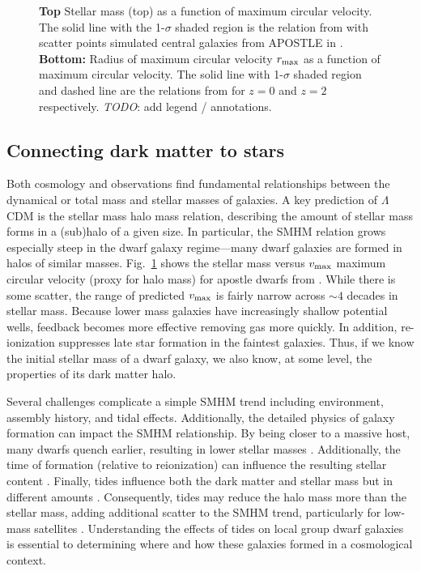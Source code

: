 \begin{figure}
\centering
{}
\caption[Stellar-mass halo-mass relation]{\textbf{Top} Stellar mass
(top) as a function of maximum circular velocity. The solid line with
the 1-\(\sigma\) shaded region is the relation from \citet{fattahi+2018}
with scatter points simulated central galaxies from APOSTLE in
\citet{fattahi+2018}. \textbf{Bottom:} Radius of maximum circular
velocity \(r_{\rm max}\) as a function of maximum circular velocity. The
solid line with 1-\(\sigma\) shaded region and dashed line are the
relations from \citet{ludlow+2016} for \(z=0\) and \(z=2\) respectively.
\emph{TODO}: add legend / annotations.}\label{fig:smhm}
\end{figure}

\subsection{Connecting dark matter to
stars}\label{connecting-dark-matter-to-stars}

Both cosmology and observations find fundamental relationships between
the dynamical or total mass and stellar masses of galaxies. A key
prediction of \(\Lambda\)CDM is the stellar mass halo mass relation,
describing the amount of stellar mass forms in a (sub)halo of a given
size. In particular, the SMHM relation grows especially steep in the
dwarf galaxy regime---many dwarf galaxies are formed in halos of similar
masses. Fig.~\ref{fig:smhm} shows the stellar mass versus
\(v_{\rm max}\) maximum circular velocity (proxy for halo mass) for
apostle dwarfs from \citet{fattahi+2018}. While there is some scatter,
the range of predicted \(v_{\rm max}\) is fairly narrow across
\(\sim 4\) decades in stellar mass. Because lower mass galaxies have
increasingly shallow potential wells, feedback becomes more effective
removing gas more quickly. In addition, re-ionization suppresses late
star formation in the faintest galaxies. Thus, if we know the initial
stellar mass of a dwarf galaxy, we also know, at some level, the
properties of its dark matter halo.

Several challenges complicate a simple SMHM trend including environment,
assembly history, and tidal effects. Additionally, the detailed physics
of galaxy formation can impact the SMHM relationship. By being closer to
a massive host, many dwarfs quench earlier, resulting in lower stellar
masses \citep[e.g.,][]{christensen+2024}. Additionally, the time of
formation (relative to reionization) can influence the resulting stellar
content \citep{kim+2024}. Finally, tides influence both the dark matter
and stellar mass but in different amounts \citep[e.g.,][]{PNM2008}.
Consequently, tides may reduce the halo mass more than the stellar mass,
adding additional scatter to the SMHM trend, particularly for low-mass
satellites \citep[e.g.,][]{fattahi+2018}. Understanding the effects of
tides on local group dwarf galaxies is essential to determining where
and how these galaxies formed in a cosmological context.

